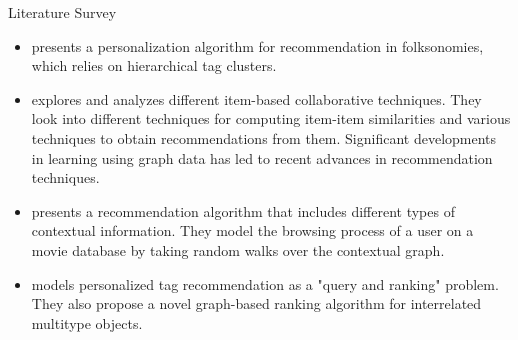 \documentclass{report}
\begin{document}
\begin{projChapter}{Literature Survey}
\begin{itemize}
  \item  {}\rbrack presents a personalization algorithm for recommendation in folksonomies, which relies on hierarchical tag clusters.
  \item  {}\rbrack explores and analyzes different item-based collaborative techniques. They look into different techniques for computing item-item similarities and various techniques to obtain recommendations from them. Significant developments in learning using graph data has led to recent advances in recommendation techniques.
  \item  {}\rbrack presents a recommendation algorithm that includes different types of contextual information. They model the browsing process of a user on a movie database by taking random walks over the contextual graph.
  \item  {}\rbrack models personalized tag recommendation as a "query and ranking" problem. They also propose a novel graph-based ranking algorithm for interrelated multitype objects.
\end{itemize}

\end{projChapter}
\end{document}
